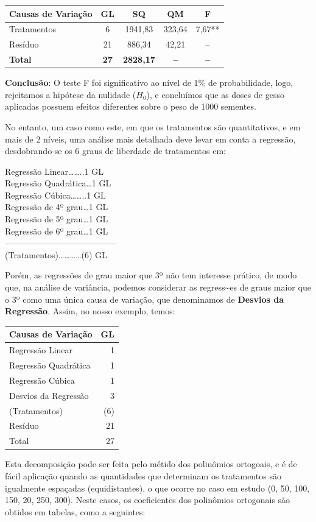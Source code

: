 \documentclass[
]{book}
\begin{document}
\begin{longtable}[]{@{}lcccc@{}}
\toprule
Causas de Variação & GL & SQ & QM & F\tabularnewline
\midrule
\endhead
Tratamentos & 6 & 1941,83 & 323,64 & 7,67**\tabularnewline
Resíduo & 21 & 886,34 & 42,21 & --\tabularnewline
\textbf{Total} & \textbf{27} & \textbf{2828,17} & \textbf{--} & \textbf{--}\tabularnewline
\bottomrule
\end{longtable}

\textbf{Conclusão}: O teste F foi significativo ao nível de \(1\%\) de probabilidade, logo, rejeitamos a hipótese da nulidade (\(H_0\)), e concluímos que as doses de gesso aplicadas possuem efeitos diferentes sobre o peso de 1000 sementes.

No entanto, um caso como este, em que os tratamentos são quantitativos, e em mais de 2 níveis, uma análise mais detalhada deve levar em conta a regressão, desdobrando-se os 6 graus de liberdade de tratamentos em:

Regressão Linear\ldots\ldots..1 GL\\
Regressão Quadrática\ldots1 GL\\
Regressão Cúbica\ldots\ldots..1 GL\\
Regressão de 4º grau\ldots1 GL\\
Regressão de 5º grau\ldots1 GL\\
Regressão de 6º grau\ldots1 GL\\
---------------------------------------\\
(Tratamentos)\ldots\ldots\ldots\ldots(6) GL

Porém, as regressões de grau maior que 3º não tem interesse prático, de modo que, na análise de variância, podemos considerar as regress\textasciitilde es de graus maior que o 3º como uma única causa de variação, que denominamos de \textbf{Desvios da Regressão}. Assim, no nosso exemplo, temos:

\begin{longtable}[]{@{}lr@{}}
\toprule
Causas de Variação & GL\tabularnewline
\midrule
\endhead
Regressão Linear & 1\tabularnewline
Regressão Quadrática & 1\tabularnewline
Regressão Cúbica & 1\tabularnewline
Desvios da Regressão & 3\tabularnewline
(Tratamentos) & (6)\tabularnewline
Resíduo & 21\tabularnewline
Total & 27\tabularnewline
\bottomrule
\end{longtable}

Esta decomposição pode ser feita pelo métido dos polinômios ortogoais, e é de fácil aplicação quando as quantidades que determinam os tratamentos são igualmente espaçadas (equidistantes), o que ocorre no caso em estudo (0, 50, 100, 150, 20, 250, 300). Neste casos, os coeficientes dos polinômios ortogonais são obtidos em tabelas, como a seguintes:
\end{document}
